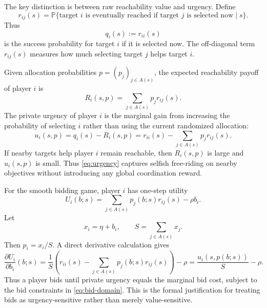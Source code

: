 \documentclass[11pt]{article}
\newcommand{\Prb}{\mathbb{P}}
\begin{document}
The key distinction is between raw reachability value and urgency. Define
\begin{equation}
  r_{ij}(s)
  =
  \Prb\{\text{target }i\text{ is eventually reached if target }j\text{ is selected now}\mid s\}.
  \label{eq:cross-reachability}
\end{equation}
Thus
\begin{equation}
  q_i(s) := r_{ii}(s)
  \label{eq:self-success}
\end{equation}
is the success probability for target $i$ if it is selected now. The off-diagonal term $r_{ij}(s)$ measures
how much selecting target $j$ helps target $i$.

Given allocation probabilities $p=(p_j)_{j\in A(s)}$, the expected reachability payoff of player $i$ is
\begin{equation}
  R_i(s,p)
  =
  \sum_{j\in A(s)} p_j r_{ij}(s).
  \label{eq:expected-private-reachability}
\end{equation}
The private urgency of player $i$ is the marginal gain from increasing the probability of selecting $i$ rather than
using the current randomized allocation:
\begin{equation}
  u_i(s,p)
  =
  q_i(s)-R_i(s,p)
  =
  r_{ii}(s)-\sum_{j\in A(s)}p_jr_{ij}(s).
  \label{eq:urgency}
\end{equation}
If nearby targets help player $i$ remain reachable, then $R_i(s,p)$ is large and $u_i(s,p)$ is small. Thus
\eqref{eq:urgency} captures selfish free-riding on nearby objectives without introducing any global coordination reward.

For the smooth bidding game, player $i$ has one-step utility
\begin{equation}
  U_i(b;s)
  =
  \sum_{j\in A(s)} p_j(b;s) r_{ij}(s) - \rho b_i.
  \label{eq:player-utility}
\end{equation}
Let
\begin{equation}
  x_i=\eta+b_i,
  \qquad
  S=\sum_{j\in A(s)}x_j.
  \label{eq:x-and-S}
\end{equation}
Then $p_i=x_i/S$. A direct derivative calculation gives
\begin{equation}
  \frac{\partial U_i}{\partial b_i}(b;s)
  =
  \frac{1}{S}\left(r_{ii}(s)-\sum_{j\in A(s)}p_j(b;s)r_{ij}(s)\right)-\rho
  =
  \frac{u_i(s,p(b;s))}{S}-\rho .
  \label{eq:marginal-utility}
\end{equation}
Thus a player bids until private urgency equals the marginal bid cost, subject to the bid constraints in
\eqref{eq:bid-domain}. This is the formal justification for treating bids as urgency-sensitive rather than merely
value-sensitive.
\end{document}

